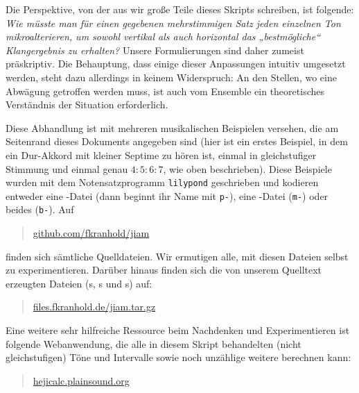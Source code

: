 Die Perspektive, von der aus wir große Teile dieses Skripts schreiben, ist
folgende: \emph{Wie müsste man für einen gegebenen mehrstimmigen Satz jeden
  einzelnen Ton mikroalterieren, um sowohl vertikal als auch horizontal das
  „bestmögliche“ Klangergebnis zu erhalten?} Unsere Formulierungen sind daher
zumeist präskriptiv. Die Behauptung, dass einige dieser Anpassungen intuitiv
umgesetzt werden, steht dazu allerdings in keinem Widerspruch: An den Stellen,
wo eine Abwägung getroffen werden muss, ist auch vom Ensemble ein theoretisches
Verständnis der Situation erforderlich.


Diese Abhandlung ist mit mehreren musikalischen Beispielen versehen, die am
Seitenrand dieses Dokuments angegeben sind (hier ist ein erstes
Beispiel, in dem ein Dur-Akkord mit kleiner Septime zu hören ist, einmal in
gleichstufiger Stimmung und einmal genau \mbox{$4:5:6:7$}, wie oben
beschrieben). Diese Beispiele wurden mit dem Notensatzprogramm \verb!lilypond!
geschrieben und kodieren entweder eine -Datei (dann beginnt ihr
Name mit \verb!p-!), eine -Datei (\verb!m-!) oder beides
(\verb!b-!). Auf
\begin{quote}
  \href{https://github.com/fkranhold/jiam/}{\textsf{github.com/fkranhold/jiam}}
\end{quote}
finden sich sämtliche Quelldateien.  Wir ermutigen alle, mit diesen Dateien
selbst zu experimentieren. Darüber hinaus finden sich die von unserem Quelltext
erzeugten Dateien (s, s und s) auf:
\begin{quote}
  \href{https://files.fkranhold.de/jiam.tar.gz}{\textsf{files.fkranhold.de/jiam.tar.gz}}
\end{quote}
Eine weitere sehr hilfreiche Ressource beim Nachdenken und Experimentieren ist
folgende Webanwendung, die alle in diesem Skript behandelten (nicht
gleichstufigen) Töne und Intervalle sowie noch unzählige weitere berechnen kann:
\begin{quote}
	\href{https://hejicalc.plainsound.org/}{\textsf{hejicalc.plainsound.org}}
\end{quote}


